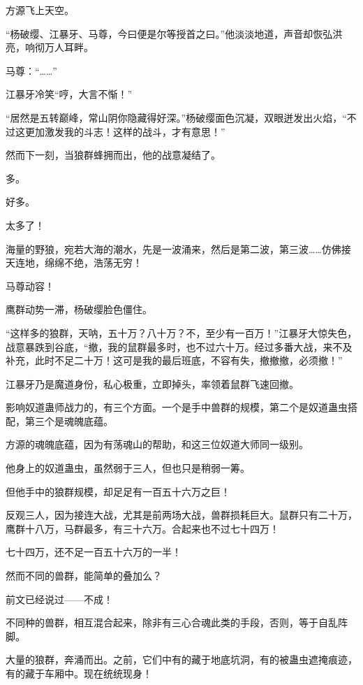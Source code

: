
\begin{this_body}



方源飞上天空。

“杨破缨、江暴牙、马尊，今曰便是尔等授首之曰。”他淡淡地道，声音却恢弘洪亮，响彻万人耳畔。

马尊：“……”

江暴牙冷笑“哼，大言不惭！”

“居然是五转巅峰，常山阴你隐藏得好深。”杨破缨面色沉凝，双眼迸发出火焰，“不过这更加激发我的斗志！这样的战斗，才有意思！”

然而下一刻，当狼群蜂拥而出，他的战意凝结了。

多。

好多。

太多了！

海量的野狼，宛若大海的潮水，先是一波涌来，然后是第二波，第三波……仿佛接天连地，绵绵不绝，浩荡无穷！

马尊动容！

鹰群动势一滞，杨破缨脸色僵住。

“这样多的狼群，天呐，五十万？八十万？不，至少有一百万！”江暴牙大惊失色，战意暴跌到谷底，“撤，我的鼠群最多时，也不过六十万。经过多番大战，来不及补充，此时不足二十万！这可是我的最后班底，不容有失，撤撤撤，必须撤！”

江暴牙乃是魔道身份，私心极重，立即掉头，率领着鼠群飞速回撤。

影响奴道蛊师战力的，有三个方面。一个是手中兽群的规模，第二个是奴道蛊虫搭配，第三个是魂魄底蕴。

方源的魂魄底蕴，因为有荡魂山的帮助，和这三位奴道大师同一级别。

他身上的奴道蛊虫，虽然弱于三人，但也只是稍弱一筹。

但他手中的狼群规模，却足足有一百五十六万之巨！

反观三人，因为接连大战，尤其是前两场大战，兽群损耗巨大。鼠群只有二十万，鹰群十八万，马群最多，有三十六万。合起来也不过七十四万！

七十四万，还不足一百五十六万的一半！

然而不同的兽群，能简单的叠加么？

前文已经说过——不成！

不同种的兽群，相互混合起来，除非有三心合魂此类的手段，否则，等于自乱阵脚。

大量的狼群，奔涌而出。之前，它们中有的藏于地底坑洞，有的被蛊虫遮掩痕迹，有的藏于车厢中。现在统统现身！


\end{this_body}
